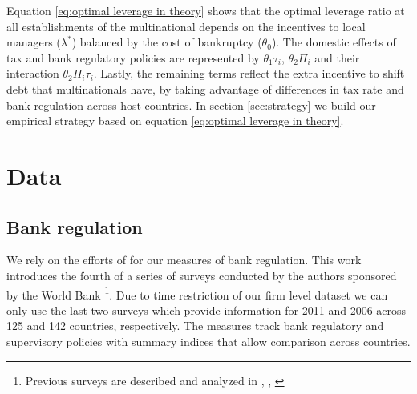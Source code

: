 \documentclass[12pt]{article}
\begin{document}
    Equation \ref{eq:optimal leverage in theory} shows that the optimal leverage ratio at all establishments of the multinational depends on the incentives to local managers ($\lambda^*$) balanced by the cost of bankruptcy ($\theta_0$). The domestic effects of tax and bank regulatory policies are represented by $\theta_1\tau_i$, $\theta_2\Pi_i$ and their interaction $\theta_2\Pi_i\tau_i$. Lastly, the remaining terms reflect the extra incentive to shift debt that multinationals have, by taking advantage of differences in tax rate and bank regulation across host countries. In section \ref{sec:strategy} we build our empirical strategy based on equation \ref{eq:optimal leverage in theory}.
    
	\section{Data} \label{sec:data}	
	\subsection{Bank regulation} \label{subsec:MPI}
	
	We rely on the efforts of \cite*{barth2013bank} for our measures of bank regulation. This work introduces the fourth of a series of surveys conducted by the authors sponsored by the World Bank \footnote{Previous surveys are described and analyzed in \cite{barth2001regulation}, \cite{barth2004bank}, \cite{barth2008bank}}. Due to time restriction of our firm level dataset we can only use the last two surveys which provide information for 2011 and 2006 across 125 and 142 countries, respectively. The measures track bank regulatory and supervisory policies with summary indices that allow comparison across countries.
\end{document}
